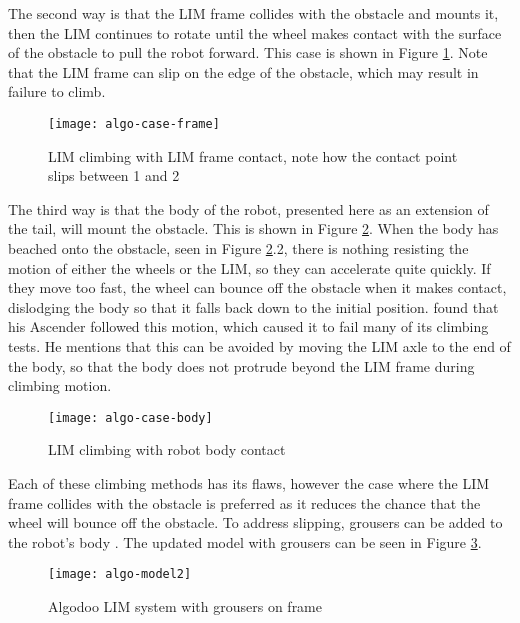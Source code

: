 The second way is that the LIM frame collides with the obstacle and mounts it, then the LIM continues to rotate until the wheel makes contact with the surface of the obstacle to pull the robot forward. This case is shown in Figure \ref{algo-case-frame}. Note that the LIM frame can slip on the edge of the obstacle, which may result in failure to climb. \\

\begin{figure}[h]
	\centering
	\texttt{[image: algo-case-frame]}
	\caption{LIM climbing with LIM frame contact, note how the contact point slips between 1 and 2}
	\label{algo-case-frame}
\end{figure}

The third way is that the body of the robot, presented here as an extension of the tail, will mount the obstacle. This is shown in Figure \ref{algo-case-body}. When the body has beached onto the obstacle, seen in Figure \ref{algo-case-body}.2, there is nothing resisting the motion of either the wheels or the LIM, so they can accelerate quite quickly. If they move too fast, the wheel can bounce off the obstacle when it makes contact, dislodging the body so that it falls back down to the initial position. \cite{Buchanan-2018} found that his Ascender followed this motion, which caused it to fail many of its climbing tests. He mentions that this can be avoided by moving the LIM axle to the end of the body, so that the body does not protrude beyond the LIM frame during climbing motion.\\

\begin{figure}[h]
	\centering
	\texttt{[image: algo-case-body]}
	\caption{LIM climbing with robot body contact}
	\label{algo-case-body}
\end{figure}

Each of these climbing methods has its flaws, however the case where the LIM frame collides with the obstacle is preferred as it reduces the chance that the wheel will bounce off the obstacle. To address slipping, grousers can be added to the robot's body \citep{rob2014}. The updated model with grousers can be seen in Figure \ref{algo-model2}.\\

\begin{figure}[h]
	\centering
	\texttt{[image: algo-model2]}
	\caption{Algodoo LIM system with grousers on frame}
	\label{algo-model2}
\end{figure}


